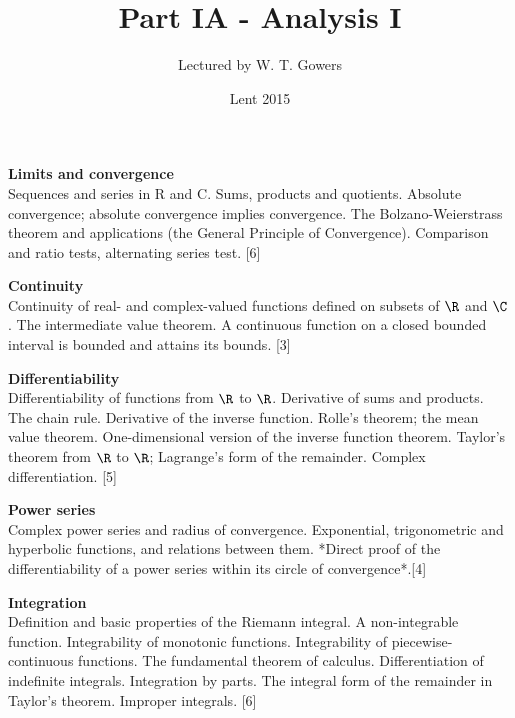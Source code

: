 \documentclass[a4paper]{article}
\title{Part IA - Analysis I}
\author{Lectured by W. T. Gowers}
\date{Lent 2015}
\begin{document}
\maketitle
{\small
\noindent\textbf{Limits and convergence}\\
Sequences and series in R and C. Sums, products and quotients. Absolute convergence; absolute convergence implies convergence. The Bolzano-Weierstrass theorem and applications (the General Principle of Convergence). Comparison and ratio tests, alternating series test.\hspace*{\fill} [6]

\vspace{10pt}
\noindent\textbf{Continuity}\\
Continuity of real- and complex-valued functions defined on subsets of $\R$ and $\C$. The intermediate value theorem. A continuous function on a closed bounded interval is bounded and attains its bounds.\hspace*{\fill} [3]

\vspace{10pt}
\noindent\textbf{Differentiability}\\
Differentiability of functions from $\R$ to $\R$. Derivative of sums and products. The chain rule. Derivative of the inverse function. Rolle's theorem; the mean value theorem. One-dimensional version of the inverse function theorem. Taylor's theorem from $\R$ to $\R$; Lagrange’s form of the remainder. Complex differentiation.\hspace*{\fill} [5]

\vspace{10pt}
\noindent\textbf{Power series}\\
Complex power series and radius of convergence. Exponential, trigonometric and hyperbolic functions, and relations between them. *Direct proof of the differentiability of a power series within its circle of convergence*.\hspace*{\fill}[4]

\vspace{10pt}
\noindent\textbf{Integration}\\
Definition and basic properties of the Riemann integral. A non-integrable function. Integrability of monotonic functions. Integrability of piecewise-continuous functions. The fundamental theorem of calculus. Differentiation of indefinite integrals. Integration by parts. The integral form of the remainder in Taylor's theorem. Improper integrals.\hspace*{\fill} [6]}
\end{document}
